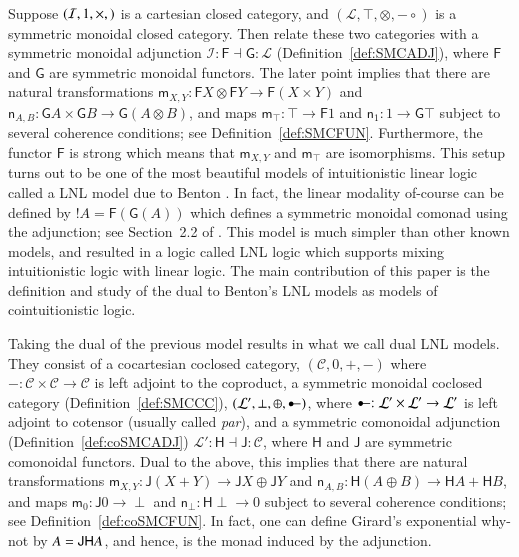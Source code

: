 \documentclass{lmcs}
\let\mto\to
\let\to\relax
\newcommand{\to}{\rightarrow}
\let\wn\relax
\newcommand{\cat}[1]{\mathcal{#1}}
\newcommand{\func}[1]{\mathsf{#1}}
\newcommand{\limp}[0]{\multimap}
\newcommand{\colimp}[0]{\multimapdotinv}
\newcommand{\m}[1]{\mathsf{m}_{#1}}
\newcommand{\n}[1]{\mathsf{n}_{#1}}
\newcommand{\wn}[0]{\mathop{?}}
\def\limp{\mathrel{-\!\circ}}
\begin{document}
Suppose $(\cat{I}, 1, \times, \to)$ is a cartesian closed category,
and $(\cat{L}, \top, \otimes, \limp)$ is a symmetric monoidal closed
category.  Then relate these two categories with a symmetric monoidal
adjunction $\cat{I} : \func{F} \dashv \func{G} : \cat{L}$
(Definition~\ref{def:SMCADJ}), where $\func{F}$ and $\func{G}$ are
symmetric monoidal functors.  The later point implies that there are
natural transformations $\m{X,Y} : \func{F}X \otimes \func{F}Y \mto
\func{F}(X \times Y)$ and $\n{A,B} : \func{G}A \times \func{G}B \mto
\func{G}(A \otimes B)$, and maps $\m\top : \top \mto \func{F}1$ and
$\n1 : 1 \mto \func{G}\top$ subject to several coherence conditions;
see Definition~\ref{def:SMCFUN}.  Furthermore, the functor $\func{F}$
is strong which means that $\m{X,Y}$ and $\m{\top}$ are isomorphisms.
This setup turns out to be one of the most beautiful models of
intuitionistic linear logic called a LNL model due to Benton
\cite{Benton:1994}.  In fact, the linear modality of-course can be
defined by $!A = \func{F}(\func{G}(A))$ which defines a symmetric
monoidal comonad using the adjunction; see Section~2.2 of
\cite{Benton:1994}.  This model is much simpler than other known
models, and resulted in a logic called LNL logic which supports mixing
intuitionistic logic with linear logic.  The main contribution of this
paper is the definition and study of the dual to Benton's LNL models
as models of cointuitionistic logic.

Taking the dual of the previous model results in what we call dual LNL
models. They consist of a cocartesian coclosed category, $(\cat{C}, 0,
+, -)$ where $- : \cat{C} \times \cat{C} \mto \cat{C}$ is left adjoint
to the coproduct, a symmetric monoidal coclosed category
(Definition~\ref{def:SMCCC}), $(\cat{L}', \perp, \oplus, \colimp)$,
where $\colimp : \cat{L}' \times \cat{L}' \mto \cat{L}'$ is left
adjoint to cotensor (usually called \emph{par}), and a symmetric
comonoidal adjunction (Definition~\ref{def:coSMCADJ}) $\cat{L'} :
\func{H} \dashv \func{J} : \cat{C}$, where $\func{H}$ and $\func{J}$
are symmetric comonoidal functors. Dual to the above, this implies
that there are natural transformations $\m{X,Y} : \func{J}(X + Y) \mto
\func{J}X \oplus \func{J}Y$ and $\n{A,B} : \func{H}(A \oplus B) \mto
\func{H}A + \func{H}B$, and maps $\m0 : \func{J}0 \mto \perp$ and
$\n\perp : \func{H}\perp \mto 0$ subject to several coherence conditions;
see Definition~\ref{def:coSMCFUN}.  In fact, one can define Girard's
exponential why-not by $\wn A = \func{JH}A$, and hence, is the monad
induced by the adjunction.
\end{document}
